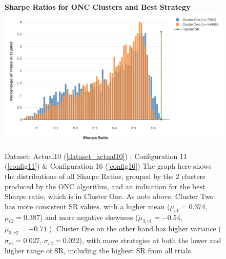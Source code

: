 \documentclass[a4paper,11pt,oneside]{article}
\theoremstyle{plain}
\theoremstyle{definition}
\begin{document}
	\begin{figure}[H]
		\centering
		\textbf{Sharpe Ratios for ONC Clusters and Best Strategy}
		\includegraphics[scale=0.4]{images/results/dsr/cluster_distributions.png} 
		\caption[Sharpe Ratios for ONC Clusters and Best Strategy]{Dataset: Actual10 (\ref{dataset_actual10}) ; Configuration 11 (\ref{config11}) \&  Configuration 16 (\ref{config16}) 
			 \newline The graph here shows the distributions of all Sharpe Ratios, grouped by the 2 clusters produced by the ONC algorithm, and an indication for the best Sharpe ratio, which is in Cluster One. As note above, Cluster Two has more consistent SR values, with a higher mean ($\mu_{c1} = 0.374$, $\mu_{c2} = 0.387$) and more negative skewness ($\tilde{\mu}_{3,c1} = -0.54$, $\tilde{\mu}_{3,c2} = -0.74$ ). Cluster One on the other hand has higher variance ($\sigma_{c1} = 0.027$, $\sigma_{c2} = 0.022$), with more strategies at both the lower and higher range of SR, including the highest SR from all trials.}
		\label{figure-dsr_clusters}
	\end{figure}
\end{document}
